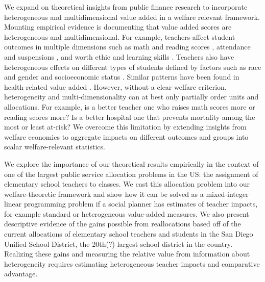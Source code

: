 \documentclass[12pt]{article}
\theoremstyle{definition}
\theoremstyle{definition}
\theoremstyle{definition}
\theoremstyle{definition}
\begin{document}
We expand on theoretical insights from public finance research to incorporate heterogeneous and multidimensional value added in a welfare relevant framework. Mounting empirical evidence is documenting that value added scores are heterogeneous and multidimensional. For example, teachers affect student outcomes in multiple dimensions such as math and reading scores \citep{condie2014teacher}, attendance and suspensions \citep{jackson2018test}, and worth ethic and learning skills \citep{pope2017multidimensional}. Teachers also have heterogeneous effects on different types of students defined by factors such as race and gender \citep[e.g.,][]{dee2005teacher,delhommer2019highschool,Delgado2020} and socioeconomic status \citep{bates2022teacher}. Similar patterns have been found in health-related value added \citep[e.g.,][]{hull2020hosptial,amyspaperwhenitcomesout}. However, without a clear welfare criterion, heterogeneity and multi-dimensionality can at best only partially order units and allocations. For example, is a better teacher one who raises math scores more or reading scores more? Is a better hospital one that prevents mortality among the most or least at-risk?  We overcome this limitation by extending insights from welfare economics to aggregate impacts on different outcomes and groups into scalar welfare-relevant statistics.





We explore the importance of our theoretical results empirically in the context of one of the largest public service allocation problems in the US: the assignment of elementary school teachers to classes. We cast this allocation problem into our welfare-theoretic framework and show how it can be solved as a mixed-integer linear programming problem if a social planner has estimates of teacher impacts, for example standard or heterogeneous value-added measures. We also present descriptive evidence of the gains possible from reallocations based off of the current allocations of elementary school teachers and students in the San Diego Unified School District, the 20th(?) largest school district in the country. Realizing these gains and measuring the relative value from information about heterogeneity requires estimating heterogeneous teacher impacts and comparative advantage.
\end{document}
